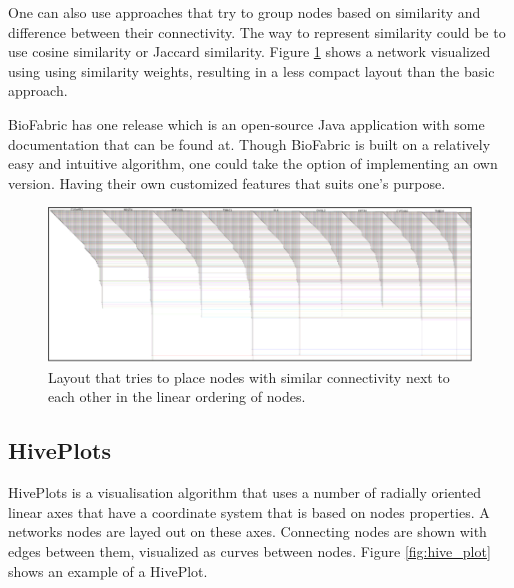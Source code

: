 \documentclass[a4paper,11pt]{kth-mag}
\begin{document}
One can also use approaches that try to group nodes based on similarity and difference between their connectivity. The way to
represent similarity could be to use cosine similarity\cite{website:Wikipedia} or Jaccard similarity\cite{website:Wikipedia2}. Figure \ref{fig:bio_sim} shows a network visualized using 
using similarity weights, resulting in a less compact layout than the basic approach.

BioFabric has one release which is an open-source Java application with some documentation that can be found at\cite{website:biofabricdoc}. Though BioFabric is built on a relatively easy and intuitive algorithm, one could
take the option of implementing an own version. Having their own customized features that suits one's purpose.
\\


\begin{figure}[!htbp]
	\centering
	\includegraphics[scale=0.5]{BIOSim}
	\caption{Layout that tries to place nodes with similar connectivity next to each other in the linear ordering of nodes.}
	\label{fig:bio_sim}
\end{figure}

\subsection{HivePlots}
HivePlots is a visualisation algorithm that uses a number of radially oriented linear axes that have a coordinate system that is based on nodes properties. A networks nodes are layed out on these axes. Connecting nodes are
shown with edges between them, visualized as curves between nodes. Figure \ref{fig:hive_plot} shows an example of a HivePlot.
\end{document}
